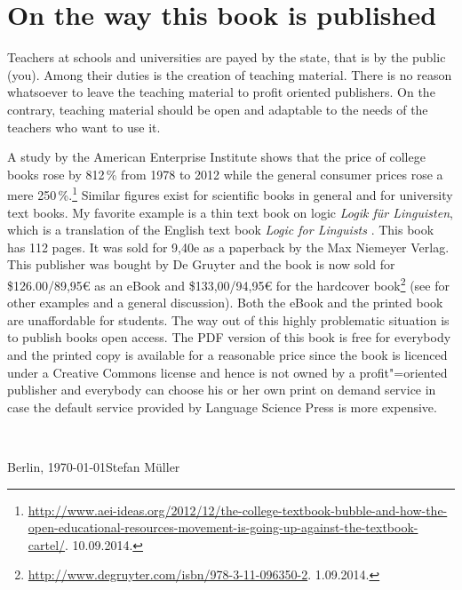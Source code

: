 \section*{On the way this book is published}

Teachers at schools and universities are payed by the state, that is by the public (you). Among
their duties is the creation of teaching material. There is no reason whatsoever to leave the
teaching material to profit oriented publishers. On the contrary, teaching material should be open
and adaptable to the needs of the teachers who want to use it. 

A study by the American Enterprise Institute shows that the price of college books rose by 812\,\%
from 1978 to 2012 while the general consumer prices rose a mere 250\,\%.\footnote{
\url{http://www.aei-ideas.org/2012/12/the-college-textbook-bubble-and-how-the-open-educational-resources-movement-is-going-up-against-the-textbook-cartel/}.
10.09.2014.%
} Similar figures exist for scientific books in general and for university text books. My favorite example is a thin text book
on logic \emph{Logik für Linguisten}, which is a translation of the English text book \emph{Logic for
Linguists} \citep{AAD73a}. This book has 112 pages. It was sold for 9,40e as a paperback by the Max Niemeyer
Verlag. This publisher was bought by De Gruyter and the book is now sold for \$126.00/89,95€ as an
eBook and \$133,00/94,95€ for the hardcover book\footnote{
  \url{http://www.degruyter.com/isbn/978-3-11-096350-2}. 1.09.2014.
} (see \citealp{MuellerOA} for other examples and a general discussion). Both the eBook and the printed book are unaffordable for students. The way out of this highly
problematic situation is to publish books open access. The PDF version of this book is free for
everybody and the printed copy is available for a reasonable price since the book is licenced under
a Creative Commons license and hence is not owned by a
profit"=oriented publisher and everybody can choose his or her own print on demand service in case
the default service provided by Language Science Press is more expensive.

~\medskip

\noindent
Berlin, \today\hfill Stefan Müller
